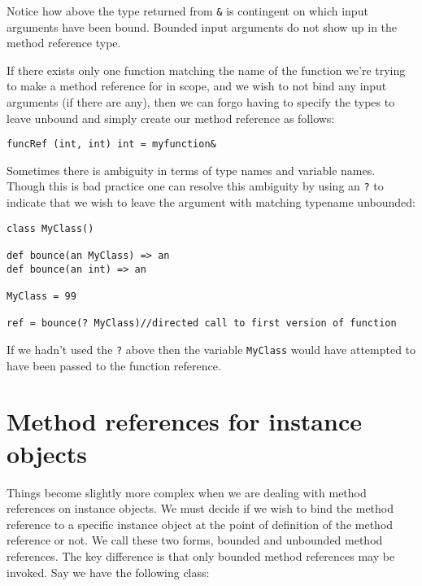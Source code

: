 \documentclass[conc-doc]{subfiles}
\begin{document}
Notice how above the type returned from \lstinline{&} is contingent on which input arguments have been bound. Bounded input arguments do not show up in the method reference type.

If there exists only one function matching the name of the function we're trying to make a method reference for in scope, and we wish to not bind any input arguments (if there are any), then we can forgo having to specify the types to leave unbound and simply create our method reference as follows:

\begin{lstlisting}
funcRef (int, int) int = myfunction&
\end{lstlisting}

Sometimes there is ambiguity in terms of type names and variable names. Though this is bad practice one can resolve this ambiguity by using an \lstinline{?} to indicate that we wish to leave the argument with matching typename unbounded:

\begin{lstlisting}
class MyClass()

def bounce(an MyClass) => an
def bounce(an int) => an

MyClass = 99

ref = bounce(? MyClass)//directed call to first version of function
\end{lstlisting}

If we hadn't used the \lstinline{?} above then the variable \lstinline{MyClass} would have attempted to have been passed to the function reference.





\section{Method references for instance objects}
Things become slightly more complex when we are dealing with method references on instance objects. We must decide if we wish to bind the method reference to a specific instance object at the point of definition of the method reference or not. We call these two forms, bounded and unbounded method references. The key difference is that only bounded method references may be invoked. Say we have the following class:
\end{document}
